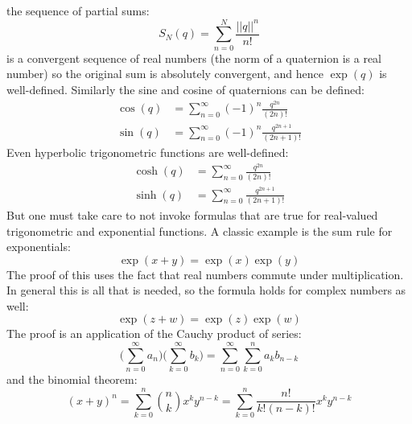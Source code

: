 \documentclass{article}
\begin{document}
            the sequence of partial sums:
            \begin{equation}
                S_{N}(q)=\sum_{n=0}^{N}\frac{||q||^{n}}{n!}
            \end{equation}
            is a convergent sequence of real numbers (the norm of a quaternion
            is a real number) so the original sum is absolutely convergent,
            and hence $\exp(q)$ is well-defined. Similarly the sine and cosine
            of quaternions can be defined:
            \begin{align}
                \cos(q)&=\sum_{n=0}^{\infty}(-1)^{n}\frac{q^{2n}}{(2n)!}\\
                \sin(q)&=\sum_{n=0}^{\infty}(-1)^{n}\frac{q^{2n+1}}{(2n+1)!}
            \end{align}
            Even hyperbolic trigonometric functions are well-defined:
            \begin{align}
                \cosh(q)&=\sum_{n=0}^{\infty}\frac{q^{2n}}{(2n)!}\\
                \sinh(q)&=\sum_{n=0}^{\infty}\frac{q^{2n+1}}{(2n+1)!}
            \end{align}
            But one must take care to not invoke formulas that are true for
            real-valued trigonometric and exponential functions. A classic
            example is the sum rule for exponentials:
            \begin{equation}
                \exp(x+y)=\exp(x)\exp(y)
            \end{equation}
            The proof of this uses the fact that real numbers commute under
            multiplication. In general this is all that is needed, so the
            formula holds for complex numbers as well:
            \begin{equation}
                \exp(z+w)=\exp(z)\exp(w)
            \end{equation}
            The proof is an application of the Cauchy product of series:
            \begin{equation}
                \Big(\sum_{n=0}^{\infty}a_{n}\Big)
                    \Big(\sum_{k=0}^{\infty}b_{k}\Big)
                =\sum_{n=0}^{\infty}\sum_{k=0}^{n}a_{k}b_{n-k}
            \end{equation}
            and the binomial theorem:
            \begin{equation}
                (x+y)^{n}
                =\sum_{k=0}^{n}\binom{n}{k}x^{k}y^{n-k}
                =\sum_{k=0}^{n}\frac{n!}{k!(n-k)!}x^{k}y^{n-k}
            \end{equation}
\end{document}

